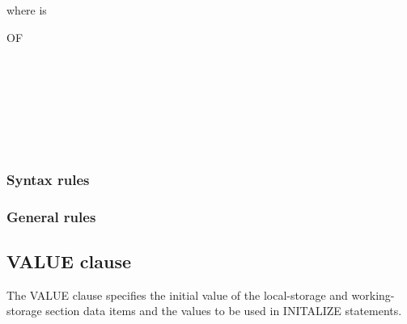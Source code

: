 where  is

\begin{syntax}[\miscextcolour]
  \begin{1=}
    \begin{0-1}
      OF
      \begin{1=}
         \\

         \\

         \\
         \\
         \\
         \\
      \end{1=}
    \end{0-1}
  \end{1=}
\end{syntax}

\subsubsection{Syntax rules}

\subsubsection{General rules}

\subsection{VALUE clause}

The VALUE clause specifies the initial value of the local-storage and working-storage section data items and the values to be used in INITALIZE statements.

